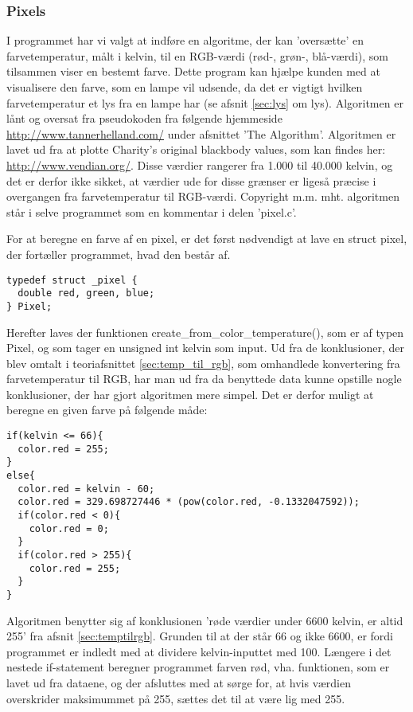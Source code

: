 \subsubsection{Pixels}
I programmet har vi valgt at indføre en algoritme, der kan ’oversætte’ en farvetemperatur, målt i kelvin, til en RGB-værdi (rød-, grøn-, blå-værdi), som tilsammen viser en bestemt farve. Dette program kan hjælpe kunden med at visualisere den farve, som en lampe vil udsende, da det er vigtigt hvilken farvetemperatur et lys fra en lampe har (se afsnit \ref{sec:lys} om lys). Algoritmen er lånt og oversat fra pseudokoden fra følgende hjemmeside \href{http://www.tannerhelland.com/4435/convert-temperature-rgb-algorithm-code/}{http://www.tannerhelland.com/} under afsnittet 'The Algorithm'. Algoritmen er lavet ud fra at plotte Charity’s original blackbody values, som kan findes her: \href{http://www.vendian.org/mncharity/dir3/blackbody/UnstableURLs/bbr_color.html}{http://www.vendian.org/}. Disse værdier rangerer fra 1.000 til 40.000 kelvin, og det er derfor ikke sikket, at værdier ude for disse grænser er ligeså præcise i overgangen fra farvetemperatur til RGB-værdi. Copyright m.m. mht. algoritmen står i selve programmet som en kommentar i delen ’pixel.c’.


For at beregne en farve af en pixel, er det først nødvendigt at lave en struct pixel, der fortæller programmet, hvad den består af. 
\begin{lstlisting}[style=Cstyle, caption=Struct af Pixel]
typedef struct _pixel {
  double red, green, blue;
} Pixel;
\end{lstlisting}

Herefter laves der funktionen create\_from\_color\_temperature(), som er af typen Pixel, og som tager en unsigned int kelvin som input. Ud fra de konklusioner, der blev omtalt i teoriafsnittet \ref{sec:temp_til_rgb}, som omhandlede konvertering fra farvetemperatur til RGB, har man ud fra da benyttede data kunne opstille nogle konklusioner, der har gjort algoritmen mere simpel. Det er derfor muligt at beregne en given farve på følgende måde: 
\begin{lstlisting}[style=Cstyle, caption=Beregning af rød farve]
if(kelvin <= 66){
  color.red = 255;
}
else{
  color.red = kelvin - 60;
  color.red = 329.698727446 * (pow(color.red, -0.1332047592));
  if(color.red < 0){
    color.red = 0;
  }
  if(color.red > 255){
    color.red = 255;
  }
}
\end{lstlisting}

Algoritmen benytter sig af konklusionen 'røde værdier under 6600 kelvin, er altid 255' fra afsnit \ref{sec:temptilrgb}. Grunden til at der står 66 og ikke 6600, er fordi programmet er indledt med at dividere kelvin-inputtet med 100. Længere i det nestede if-statement beregner programmet farven rød, vha. funktionen, som er lavet ud fra dataene, og der afsluttes med at sørge for, at hvis værdien overskrider maksimummet på 255, sættes det til at være lig med 255.


